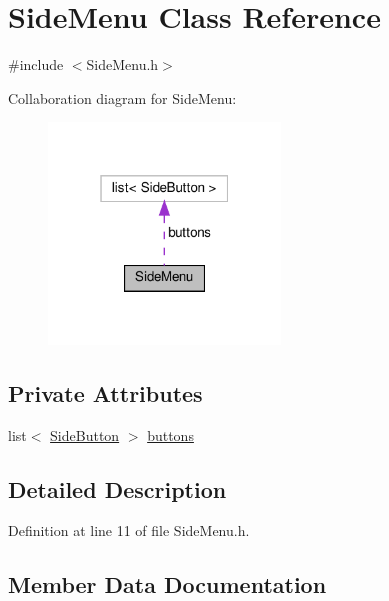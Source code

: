 \hypertarget{class_side_menu}{}\section{Side\+Menu Class Reference}
\label{class_side_menu}


{\ttfamily \#include $<$Side\+Menu.\+h$>$}



Collaboration diagram for Side\+Menu\+:
\nopagebreak
\begin{figure}[H]
\begin{center}
\leavevmode
\includegraphics[width=175pt]{class_side_menu__coll__graph}
\end{center}
\end{figure}
\subsection*{Private Attributes}
\begin{DoxyCompactItemize}
\item 
list$<$ \mbox{\hyperlink{struct_side_button}{Side\+Button}} $>$ \mbox{\hyperlink{class_side_menu_af6b73f113ae5b74a238f5b167c8902cb}{buttons}}
\end{DoxyCompactItemize}


\subsection{Detailed Description}


Definition at line 11 of file Side\+Menu.\+h.



\subsection{Member Data Documentation}
\mbox{\label{class_side_menu_af6b73f113ae5b74a238f5b167c8902cb}} 
